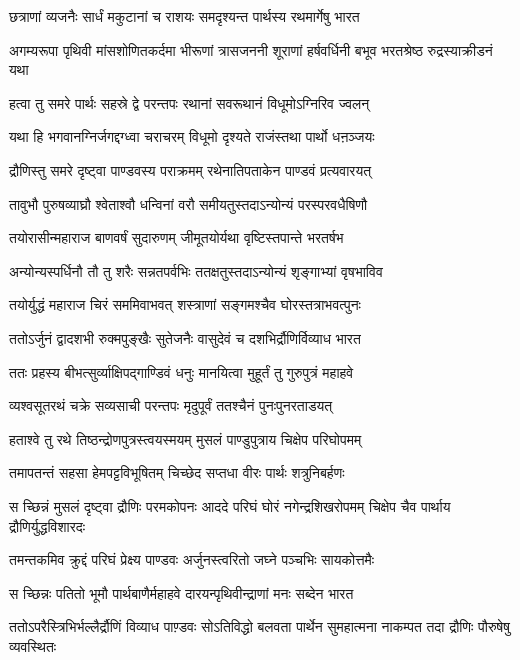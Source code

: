 \twolineshloka
{छत्राणां व्यजनैः सार्धं मकुटानां च राशयः}
{समदृश्यन्त पार्थस्य रथमार्गेषु भारत}


\threelineshloka
{अगम्यरूपा पृथिवी मांसशोणितकर्दमा}
{भीरूणां त्रासजननी शूराणां हर्षवर्धिनी}
{बभूव भरतश्रेष्ठ रुद्रस्याक्रीडनं यथा}


\twolineshloka
{हत्वा तु समरे पार्थः सहस्रे द्वे परन्तपः}
{रथानां सवरूथानं विधूमोऽग्निरिव ज्वलन्}


\twolineshloka
{यथा हि भगवानग्निर्जगद्दग्ध्वा चराचरम्}
{विधूमो दृश्यते राजंस्तथा पार्थो धऩञ्जयः}


\twolineshloka
{द्रौणिस्तु समरे दृष्ट्वा पाण्डवस्य पराक्रमम्}
{रथेनातिपताकेन पाण्डवं प्रत्यवारयत्}


\twolineshloka
{तावुभौ पुरुषव्याघ्रौ श्वेताश्वौ धन्विनां वरौ}
{समीयतुस्तदाऽन्योन्यं परस्परवधैषिणौ}


\twolineshloka
{तयोरासीन्महाराज बाणवर्षं सुदारुणम्}
{जीमूतयोर्यथा वृष्टिस्तपान्ते भरतर्षभ}


\twolineshloka
{अन्योन्यस्पर्धिनौ तौ तु शरैः सन्नतपर्वभिः}
{ततक्षतुस्तदाऽन्योन्यं शृङ्गाभ्यां वृषभाविव}


\twolineshloka
{तयोर्युद्धं महाराज चिरं सममिवाभवत्}
{शस्त्राणां सङ्गमश्चैव घोरस्तत्राभवत्पुनः}


\twolineshloka
{ततोऽर्जुनं द्वादशभी रुक्मपुङ्खैः सुतेजनैः}
{वासुदेवं च दशभिर्द्रौणिर्विव्याध भारत}


\twolineshloka
{ततः प्रहस्य बीभत्सुर्व्याक्षिपद्गाण्डिवं धनुः}
{मानयित्वा मुहूर्तं तु गुरुपुत्रं महाहवे}


\twolineshloka
{व्यश्वसूतरथं चक्रे सव्यसाची परन्तपः}
{मृदुपूर्वं ततश्चैनं पुनःपुनरताडयत्}


\twolineshloka
{हताश्वे तु रथे तिष्ठन्द्रोणपुत्रस्त्वयस्मयम्}
{मुसलं पाण्डुपुत्राय चिक्षेप परिघोपमम्}


\twolineshloka
{तमापतन्तं सहसा हेमपट्टविभूषितम्}
{चिच्छेद सप्तधा वीरः पार्थः शत्रुनिबर्हणः}


\threelineshloka
{स च्छिन्नं मुसलं दृष्ट्वा द्रौणिः परमकोपनः}
{आददे परिघं घोरं नगेन्द्रशिखरोपमम्}
{चिक्षेप चैव पार्थाय द्रौणिर्युद्धविशारदः}


\twolineshloka
{तमन्तकमिव क्रुद्दं परिघं प्रेक्ष्य पाण्डवः}
{अर्जुनस्त्वरितो जघ्ने पञ्चभिः सायकोत्तमैः}


\twolineshloka
{स च्छिन्नः पतितो भूमौ पार्थबाणैर्महाहवे}
{दारयन्पृथिवीन्द्राणां मनः सब्देन भारत}


ततोऽपरैस्त्रिभिर्भल्लैर्द्रौणिं विव्याध पाण़्डवः
\twolineshloka
{सोऽतिविद्धो बलवता पार्थेन सुमहात्मना}
{नाकम्पत तदा द्रौणिः पौरुषेषु व्यवस्थितः}


